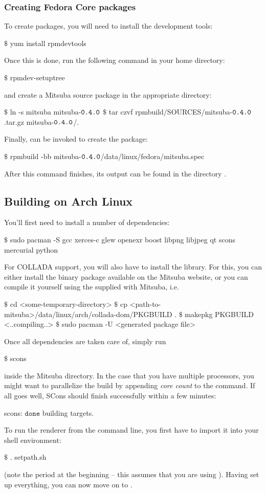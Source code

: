 \subsubsection{Creating Fedora Core packages}
To create  packages, you will need to install the  development tools:
\begin{shell}
$\text{\$}$ yum install rpmdevtools
\end{shell}
Once this is done, run the following command in your home directory:
\begin{shell}
$\text{\$}$ rpmdev-setuptree
\end{shell}
and create a Mitsuba source package in the appropriate directory:
\begin{shell}
$\text{\$}$ ln -s mitsuba mitsuba-$\texttt{0.4.0}$
$\text{\$}$ tar czvf rpmbuild/SOURCES/mitsuba-$\texttt{0.4.0}$.tar.gz mitsuba-$\texttt{0.4.0}$/.
\end{shell}
Finally,  can be invoked to create the package:
\begin{shell}
$\text{\$}$ rpmbuild -bb mitsuba-$\texttt{0.4.0}$/data/linux/fedora/mitsuba.spec
\end{shell}
After this command finishes, its output can be found in the directory .
\subsection{Building on Arch Linux}
You'll first need to install a number of dependencies: 
\begin{shell}
$\text{\$}$ sudo pacman -S gcc xerces-c glew openexr boost libpng libjpeg qt scons mercurial python
\end{shell}
For COLLADA support, you will also have to install the 
library. For this, you can either install the binary package available on
the Mitsuba website, or you can compile it yourself using the 
supplied with Mitsuba, i.e.
\begin{shell}
$\text{\$}$ cd <some-temporary-directory>
$\text{\$}$ cp <path-to-mitsuba>/data/linux/arch/collada-dom/PKGBUILD .
$\text{\$}$ makepkg PKGBUILD
<..compiling..>
$\text{\$}$ sudo pacman -U <generated package file>
\end{shell}
Once all dependencies are taken care of, simply run
\begin{shell}
$\text{\$}$ scons
\end{shell}
inside the Mitsuba directory. In the case that you have multiple processors, you might want to parallelize the build by appending \emph{core count} to the command.
If all goes well, SCons should finish successfully within a few minutes:
\begin{shell}
scons: $\texttt{done}$ building targets.
\end{shell}
To run the renderer from the command line, you first have to import it into your shell environment:
\begin{shell}
$\text{\$}$ . setpath.sh
\end{shell}
(note the period at the beginning -- this assumes that you are using ).
Having set up everything, you can now move on to .
